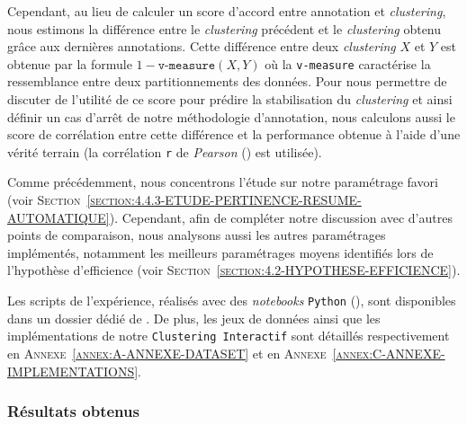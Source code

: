 			Cependant, au lieu de calculer un score d'accord entre annotation et \textit{clustering}, nous estimons la différence entre le \textit{clustering} précédent et le \textit{clustering} obtenu grâce aux dernières annotations.
			Cette différence entre deux \textit{clustering} $X$ et $Y$ est obtenue par la formule $1-\texttt{v-measure}(X,Y)$ où la \texttt{v-measure} caractérise la ressemblance entre deux partitionnements des données.
			Pour nous permettre de discuter de l'utilité de ce score pour prédire la stabilisation du \textit{clustering} et ainsi définir un cas d'arrêt de notre méthodologie d'annotation, nous calculons aussi le score de corrélation entre cette différence et la performance obtenue à l'aide d'une vérité terrain (la corrélation \texttt{r} de \textit{Pearson} (\cite{kirch:2008:pearson-correlation-coefficient}) est utilisée).
			
			\begin{leftBarIdea}
				Comme précédemment, nous concentrons l'étude sur notre paramétrage favori (voir \textsc{Section~\ref{section:4.4.3-ETUDE-PERTINENCE-RESUME-AUTOMATIQUE}}).
				Cependant, afin de compléter notre discussion avec d'autres points de comparaison, nous analysons aussi les autres paramétrages implémentés, notamment les meilleurs paramétrages moyens identifiés lors de l'hypothèse d'efficience (voir \textsc{Section~\ref{section:4.2-HYPOTHESE-EFFICIENCE}}).
			\end{leftBarIdea}
			
			\begin{leftBarInformation}
				Les scripts de l'expérience, réalisés avec des \textit{notebooks} \texttt{Python} (\cite{van-rossum-drake:2009:python-reference-manual}), sont disponibles dans un dossier dédié de \cite{schild:2021:cognitivefactory-interactiveclusteringcomparativestudy}.
				De plus, les jeux de données ainsi que les implémentations de notre \texttt{Clustering Interactif} sont détaillés respectivement en \textsc{Annexe~\ref{annex:A-ANNEXE-DATASET}} et en \textsc{Annexe~\ref{annex:C-ANNEXE-IMPLEMENTATIONS}}.
			\end{leftBarInformation}

		\subsubsection{Résultats obtenus}
			
